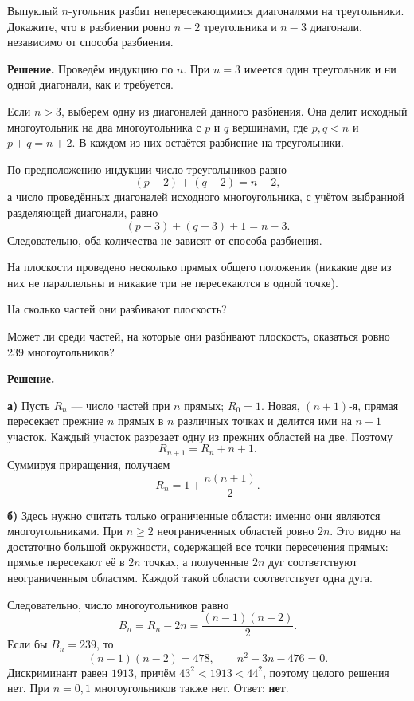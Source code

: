 \begin{problems}
\item Выпуклый $n$-угольник разбит непересекающимися диагоналями на треугольники. Докажите, что в разбиении ровно $n-2$ треугольника и $n-3$ диагонали, независимо от способа разбиения.
\par\smallskip\noindent\textbf{Решение.} Проведём индукцию по $n$. При $n=3$ имеется один треугольник и ни одной диагонали, как и требуется.
\par Если $n>3$, выберем одну из диагоналей данного разбиения. Она делит исходный многоугольник на два многоугольника с $p$ и $q$ вершинами, где $p,q<n$ и $p+q=n+2$. В каждом из них остаётся разбиение на треугольники.
\par По предположению индукции число треугольников равно
\[
(p-2)+(q-2)=n-2,
\]
а число проведённых диагоналей исходного многоугольника, с учётом выбранной разделяющей диагонали, равно
\[
(p-3)+(q-3)+1=n-3.
\]
Следовательно, оба количества не зависят от способа разбиения.\par

\item На плоскости проведено несколько прямых общего положения (никакие две из них не параллельны и никакие три не пересекаются в одной точке).
\begin{parts}
  \item На сколько частей они разбивают плоскость?
  \item Может ли среди частей, на которые они разбивают плоскость, оказаться ровно 239 многоугольников?
\end{parts}
\par\smallskip\noindent\textbf{Решение.} \par\textbf{а)} Пусть $R_n$ --- число частей при $n$ прямых; $R_0=1$. Новая, $(n+1)$-я, прямая пересекает прежние $n$ прямых в $n$ различных точках и делится ими на $n+1$ участок. Каждый участок разрезает одну из прежних областей на две. Поэтому
\[
R_{n+1}=R_n+n+1.
\]
Суммируя приращения, получаем
\[
\boxed{R_n=1+\frac{n(n+1)}2}.
\]
\par\textbf{б)} Здесь нужно считать только ограниченные области: именно они являются многоугольниками. При $n\ge2$ неограниченных областей ровно $2n$. Это видно на достаточно большой окружности, содержащей все точки пересечения прямых: прямые пересекают её в $2n$ точках, а полученные $2n$ дуг соответствуют неограниченным областям. Каждой такой области соответствует одна дуга.
\par Следовательно, число многоугольников равно
\[
B_n=R_n-2n=\frac{(n-1)(n-2)}2.
\]
Если бы $B_n=239$, то
\[
(n-1)(n-2)=478,
\qquad n^2-3n-476=0.
\]
Дискриминант равен $1913$, причём $43^2<1913<44^2$, поэтому целого решения нет. При $n=0,1$ многоугольников также нет. Ответ: \textbf{нет}.\par


\end{problems}
